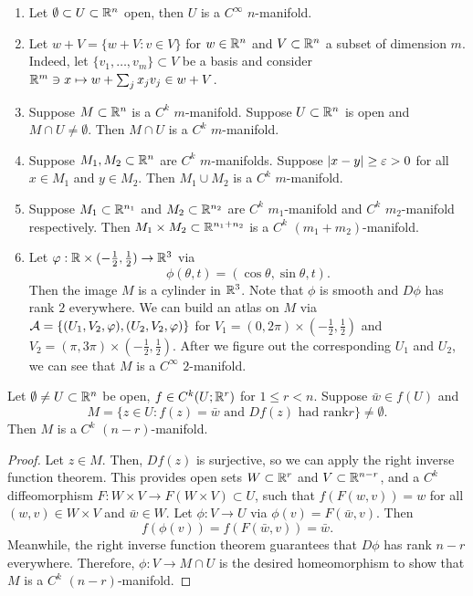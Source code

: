 \documentclass[a4paper]{article}
\begin{document}
\begin{eg}
\begin{enumerate}
\item Let $\emptyset \subset U \subset \mathbb{R}^n$ open, then
$U$ is a $C^\infty$ $n$-manifold.

\item Let $w + V = \{w + V : v \in V\}$ for $w \in \mathbb{R}^n$
and $V \subset \mathbb{R}^n$ a subset of dimension $m$. Indeed,
let $\{v_1, \dots, v_m\} \subset V$ be a basis and consider
$\mathbb{R}^m \ni x \mapsto w + \sum_j x_j v_j \in w + V$.

\item Suppose $M \subset \mathbb{R}^n$ is a $C^k$ $m$-manifold.
Suppose $U \subset \mathbb{R}^n$ is open and $M \cap U \neq
\emptyset$. Then $M \cap U$ is a $C^k$ $m$-manifold.

\item Suppose $M_1, M_2 \subset \mathbb{R}^n$ are $C^k$
$m$-manifolds. Suppose $\left\lvert x - y\right\rvert \geq \varepsilon > 0$ for all
$x \in M_1$ and $y \in M_2$. Then $M_1 \cup M_2$ is a
$C^k$ $m$-manifold.

\item Suppose $M_1 \subset \mathbb{R}^{n_1}$ and $M_2 \subset \mathbb{R}^{n_2}$
are $C^k$ $m_1$-manifold and $C^k$ $m_2$-manifold respectively.
Then $M_1 \times M_2 \subset \mathbb{R}^{n_1 + n_2}$ is a
$C^k$ $(m_1 + m_2)$-manifold.

\item Let $\varphi: \mathbb{R} \times (-\frac{1}{2}, \frac{1}{2})
\to \mathbb{R}^3$ via
\[
\phi(\theta, t) = (\cos \theta, \sin \theta, t).
\]
Then the image $M$ is a cylinder in $\mathbb{R}^3$. Note that $\phi$
is smooth and $D \phi$ has rank $2$ everywhere. We can build
an atlas on $M$ via $\mathcal{A} = \{(U_1, V_2, \varphi), (U_2, V_2, \varphi)\}$
for $V_1 = (0, 2\pi) \times (-\frac{1}{2}, \frac{1}{2})$ and
$V_2 = (\pi, 3\pi) \times (-\frac{1}{2}, \frac{1}{2})$.
After we figure out the corresponding $U_1$ and $U_2$,
we can see that $M$ is a $C^\infty$ $2$-manifold.
\end{enumerate}
\end{eg}

\begin{thm}
Let $\emptyset \neq U \subset \mathbb{R}^n$ be open, $f \in C^k(U;
\mathbb{R}^r)$ for $1 \leq r < n$. Suppose $\bar{w} \in f(U)$ and
\[
M = \{z \in U : f(z) = \bar{w} \text{ and } Df(z) \text{ had rank
$r$}\} \neq \emptyset.
\]
Then $M$ is a $C^k$ $(n-r)$-manifold.
\end{thm}

\begin{proof}
Let $z \in M$. Then, $Df(z)$ is surjective, so we can apply
the right inverse function theorem.  This provides
open sets $W \subset \mathbb{R}^r$ and $V \subset \mathbb{R}^{n-r}$, and
a $C^k$ diffeomorphism
$F : W \times V \to F(W \times V) \subset U$, such that
$f(F(w, v)) = w$ for all $(w, v) \in W \times V$ and
$\bar{w} \in W$. Let $\phi: V \to U$ via
$\phi(v) = F(\bar{w}, v)$. Then
\[
f(\phi(v)) = f(F(\bar{w}, v)) = \bar{w}.
\]
Meanwhile, the right inverse function theorem
guarantees that $D \phi$ has rank $n - r$ everywhere.
Therefore, $\phi: V \to M \cap U$ is the desired
homeomorphism to show that $M$ is a $C^k$ $(n-r)$-manifold.
\end{proof}
\end{document}
